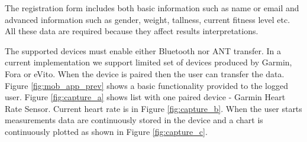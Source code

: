 \documentclass[a4paper,twoside]{article}
\begin{document}
The registration form includes both basic information such as name or email and advanced information such as gender, weight, tallness, current fitness level etc. All these data are required because they affect results interpretations.

The supported devices must enable either Bluetooth nor ANT transfer. In a current implementation we support limited set of devices produced by Garmin, Fora or eVito.  When the device is paired then the user can transfer the data. Figure \ref{fig:mob_app_prev} shows a basic functionality provided to the logged user. Figure \ref{fig:capture_a} shows list with one paired device - Garmin Heart Rate Sensor. Current heart rate is in Figure \ref{fig:capture_b}. When the user starts measurements data are continuously stored in the device and a chart is continuously plotted as shown in Figure \ref{fig:capture_c}.
\end{document}
